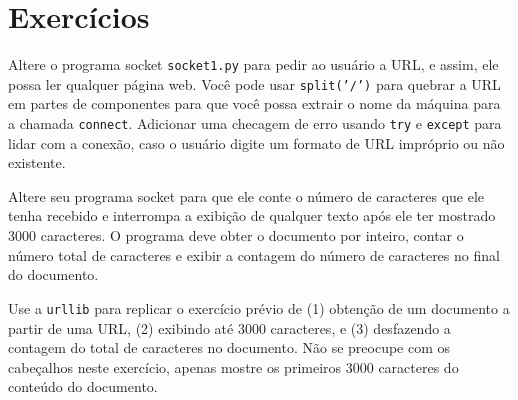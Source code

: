 
\section{Exercícios}

\begin{ex}
Altere o programa socket {\tt socket1.py} para pedir ao usuário a 
URL, e assim, ele possa ler qualquer página web.  
Você pode usar {\tt split('/')} para quebrar a URL em partes de componentes
para que você possa extrair o nome da máquina para a chamada {\tt connect}.
Adicionar uma checagem de erro usando {\tt try} e {\tt except} para lidar
com a conexão, caso o usuário digite um formato de URL impróprio ou
não existente.  
\end{ex}

\begin{ex}
Altere seu programa socket para que ele conte o número de caracteres que ele
tenha recebido e interrompa a exibição de qualquer texto após ele ter mostrado
3000 caracteres.  O programa deve obter o documento por inteiro, contar o
número total de caracteres e exibir a contagem do número de caracteres no
final do documento.
\end{ex}

\begin{ex}
Use a {\tt urllib} para replicar o exercício prévio de (1) obtenção de um
documento a partir de uma URL, (2) exibindo até 3000 caracteres, e (3) 
desfazendo a contagem do total de caracteres no documento.  Não se preocupe
com os cabeçalhos neste exercício, apenas mostre os primeiros 3000 caracteres
do conteúdo do documento.
\end{ex}

